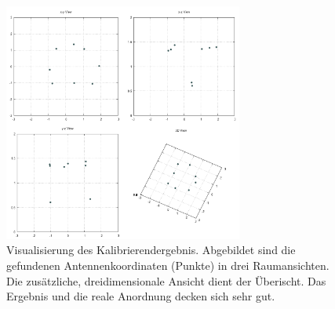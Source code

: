 \begin{figure}[ht!]
         \centering
         \includegraphics[width=0.7\textwidth]{img/calibration/calibration_results.png}
         \caption[Visualisierung des Kalibrierendergebnis]{Visualisierung des Kalibrierendergebnis. Abgebildet sind die gefundenen Antennenkoordinaten (Punkte) in drei Raumansichten. Die zusätzliche, dreidimensionale  Ansicht dient der Überischt. Das Ergebnis und die reale Anordnung decken sich sehr gut. }
         \label{fig:3dplot_coordinates}
%
\end{figure}
%
